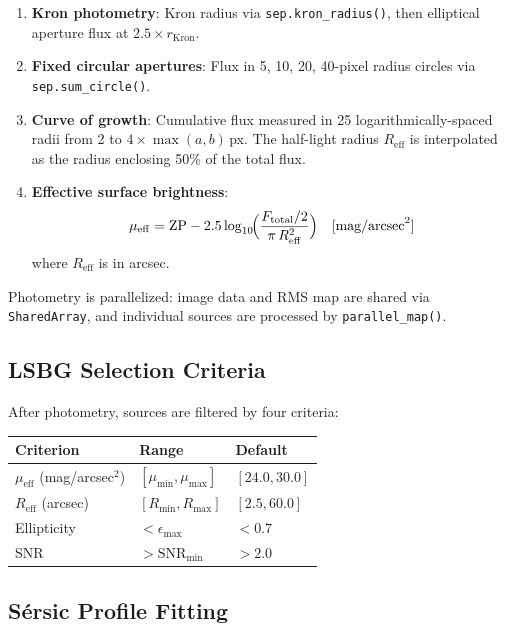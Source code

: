 \documentclass[11pt,fleqn]{book}
\begin{document}
\begin{enumerate}[leftmargin=2em]
  \item \textbf{Kron photometry}: Kron radius via \texttt{sep.kron\_radius()}, then elliptical aperture flux at $2.5\times r_\mathrm{Kron}$.
  \item \textbf{Fixed circular apertures}: Flux in 5, 10, 20, 40-pixel radius circles via \texttt{sep.sum\_circle()}.
  \item \textbf{Curve of growth}: Cumulative flux measured in 25 logarithmically-spaced radii from 2 to $4\times\max(a,b)$\,px.  The half-light radius $R_\mathrm{eff}$ is interpolated as the radius enclosing 50\% of the total flux.
  \item \textbf{Effective surface brightness}:
  \begin{equation}
    \mu_\mathrm{eff} = \mathrm{ZP} - 2.5\log_{10}\!\Bigl(\frac{F_\mathrm{total}/2}{\pi\,R_\mathrm{eff}^2}\Bigr) \quad [\text{mag/arcsec}^2]
  \end{equation}
  where $R_\mathrm{eff}$ is in arcsec.
\end{enumerate}

Photometry is parallelized: image data and RMS map are shared via \texttt{SharedArray}, and individual sources are processed by \texttt{parallel\_map()}.

\subsection{LSBG Selection Criteria}

After photometry, sources are filtered by four criteria:

\begin{center}
\begin{tabular}{lll}
\toprule
\textbf{Criterion} & \textbf{Range} & \textbf{Default} \\
\midrule
$\mu_\mathrm{eff}$ (mag/arcsec$^2$) & $[\mu_\mathrm{min}, \mu_\mathrm{max}]$ & $[24.0, 30.0]$ \\
$R_\mathrm{eff}$ (arcsec) & $[R_\mathrm{min}, R_\mathrm{max}]$ & $[2.5, 60.0]$ \\
Ellipticity & $< \epsilon_\mathrm{max}$ & $< 0.7$ \\
SNR & $> \mathrm{SNR}_\mathrm{min}$ & $> 2.0$ \\
\bottomrule
\end{tabular}
\end{center}

\subsection{S\'ersic Profile Fitting}
\end{document}
